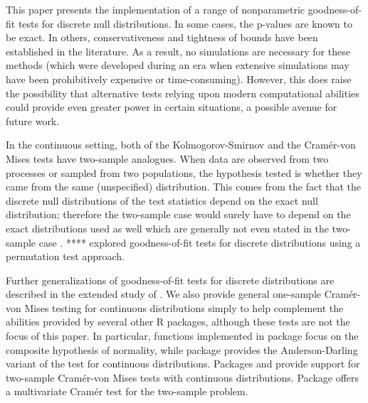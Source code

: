 This paper presents the implementation of a range of nonparametric
goodness-of-fit tests for discrete null distributions.  In some cases,
the p-values are known to be exact.  In others, conservativeness 
and tightness of bounds have been established in the literature.  As a result,
no simulations are necessary for these methods (which were developed during
an era when extensive simulations may have been prohibitively expensive
or time-consuming).
However, this does raise the possibility that alternative tests relying upon
modern computational abilities could provide even greater power in certain
situations, a possible avenue for future work.



In the continuous setting, both of 
the Kolmogorov-Smirnov and the Cram\'{e}r-von Mises tests
have two-sample analogues. When data are
observed from two processes or sampled from two populations, 
the hypothesis tested is 
whether they came from the same (unspecified) distribution. 
This comes from the fact that the discrete null distributions
of the test statistics depend on the exact null distribution; 
therefore the two-sample case would surely have to depend
on the exact distributions used as well
which are generally not even stated in the two-sample case
\cite{newpaper}.  **** explored goodness-of-fit tests for
discrete distributions using a permutation test approach.


Further 
generalizations of goodness-of-fit tests for discrete distributions
are described in the
extended study of \cite{dewev1973}.  We also provide general one-sample
Cram\'{e}r-von Mises testing for continuous distributions simply
to help complement the abilities provided by several other
R packages, although these tests are not the focus of this paper.
In particular, functions implemented in package  
\citep{nortest} focus on the
composite hypothesis of normality, while
package  \citep{ADGofTest} provides the Anderson-Darling variant
of the test for continuous distributions.  Packages
 \citep{CvM2SL1Test} and  
\citep{CvM2SL2Test} provide support for
two-sample Cram\'{e}r-von Mises tests with continuous distributions.
Package  \citep{cramer} offers a multivariate Cram\'{e}r test for
the two-sample problem.




